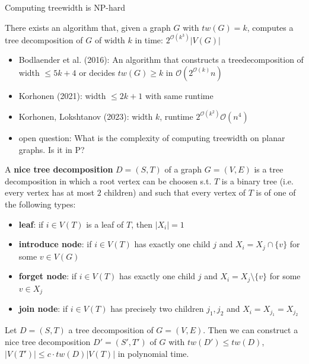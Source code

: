 \begin{remark*}
    Computing treewidth is NP-hard
\end{remark*}
\begin{theorem}[Bodlaender]\label{8.8}
    There exists an algorithm that, given a graph $G$ with $tw(G)=k$, computes a tree decomposition of $G$ of width $k$ in time: $2^{\mathcal{O}(k^3)}|V(G)|$
\end{theorem}
\begin{remark*}
    \begin{itemize}
        \item Bodlaender et al. (2016): An algorithm that constructs a treedecomposition of width $\leq 5k+4$ or decides $tw(G)\geq k$ in $\mathcal{O}(2^{\mathcal{O}(k)}n)$
        \item Korhonen (2021): width $\leq 2k+1$ with same runtime
        \item Korhonen, Lokshtanov (2023): width $k$, runtime $2^{\mathcal{O}(k^2)}\mathcal{O}(n^4)$
        \item open question: What is the complexity of computing treewidth on planar graphs. Is it in P?
    \end{itemize}
\end{remark*}
\begin{definition}\label{8.9}
    A \textbf{nice tree decomposition} $D=(S,T)$ of a graph $G=(V,E)$ is a tree decomposition in which a root vertex can be choosen s.t. $T$ is a binary tree (i.e. every vertex has at most $2$ children) and such that every vertex of $T$ is of one of the following types:
    \begin{itemize}
        \item \textbf{leaf}: if $i\in V(T)$ is a leaf of $T$, then $|X_i|=1$
        \item \textbf{introduce node}: if $i\in V(T)$ has exactly one child $j$ and $X_i=X_j\cap\{v\}$ for some $v\in V(G)$
        \item \textbf{forget node}: if $i\in V(T)$ has exactly one child $j$ and $X_i=X_j\setminus\{v\}$ for some $v\in X_j$
        \item \textbf{join node}: if $i\in V(T)$ has precisely two children $j_1,j_2$ and $X_i=X_{j_1}=X_{j_2}$
    \end{itemize}
\end{definition}
\begin{theorem}\label{8.10}
    Let $D=(S,T)$ a tree decomposition of $G=(V,E)$. Then we can construct a nice tree decomposition $D'=(S',T')$ of $G$ with $tw(D')\leq tw(D)$, $|V(T')|\leq c \cdot tw(D)|V(T)|$ in polynomial time.
\end{theorem}
